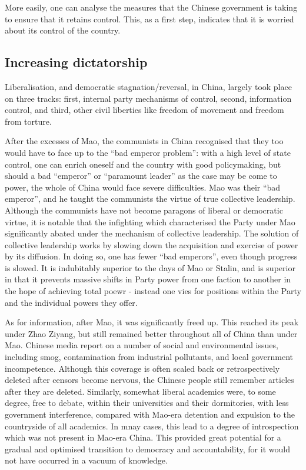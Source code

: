 	More easily, one can analyse the measures that the Chinese government is taking to ensure that it retains control. This, as a first step, indicates that it is worried about its control of the country.


\subsection{Increasing dictatorship}


	Liberalisation, and democratic stagnation/reversal, in China, largely took place on three tracks: first, internal party mechanisms of control, second, information control, and third, other civil liberties like freedom of movement and freedom from torture.

	After the excesses of Mao, the communists in China recognised that they too would have to face up to the ``bad emperor problem'': with a high level of state control, one can enrich oneself and the country with good policymaking, but should a bad ``emperor'' or ``paramount leader'' as the case may be come to power, the whole of China would face severe difficulties. Mao was their ``bad emperor'', and he taught the communists the virtue of true collective leadership. Although the communists have not become paragons of liberal or democratic virtue, it is notable that the infighting which characterised the Party under Mao significantly abated under the mechanism of collective leadership. The solution of collective leadership works by slowing down the acquisition and exercise of power by its diffusion. In doing so, one has fewer ``bad emperors'', even though progress is slowed. It is indubitably superior to the days of Mao or Stalin, and is superior in that it prevents massive shifts in Party power from one faction to another in the hope of achieving total poewr - instead one vies for positions within the Party and the individual powers they offer.

	As for information, after Mao, it was significantly freed up. This reached its peak under Zhao Ziyang, but still remained better throughout all of China than under Mao. Chinese media report on a number of social and environmental issues, including smog, contamination from industrial pollutants, and local government incompetence. Although this coverage is often scaled back or retrospectively deleted after censors become nervous, the Chinese people still remember articles after they are deleted. Similarly, somewhat liberal academics were, to some degree, free to debate, within their universities and their dormitories, with less government interference, compared with Mao-era detention and expulsion to the countryside of all academics. In mnay cases, this lead to a degree of introspection which was not present in Mao-era China. This provided great potential for a gradual and optimised transition to democracy and accountability, for it would not have occurred in a vacuum of knowledge.

